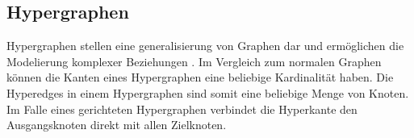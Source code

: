 \subsection{Hypergraphen}
Hypergraphen stellen eine generalisierung von Graphen dar und ermöglichen die Modelierung komplexer Beziehungen \cite{anglesintro}.
Im Vergleich zum normalen Graphen können die Kanten eines Hypergraphen eine beliebige Kardinalität haben.
Die Hyperedges in einem Hypergraphen sind somit eine beliebige Menge von Knoten.
Im Falle eines gerichteten Hypergraphen verbindet die Hyperkante den Ausgangsknoten direkt mit allen Zielknoten.

